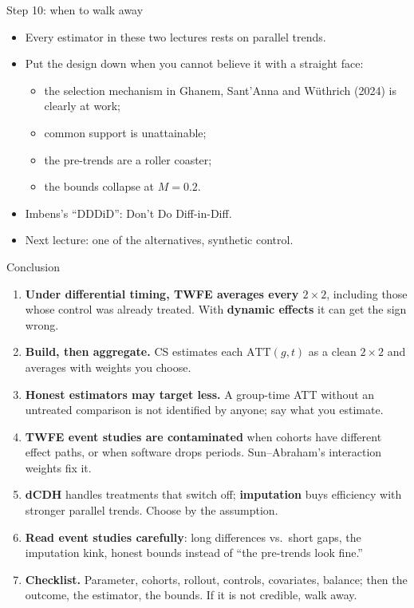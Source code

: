 \documentclass[
  11pt,
  ignorenonframetext,
  aspectratio=169,
]{beamer}
\providecommand{\tightlist}{%
  \setlength{\itemsep}{0pt}\setlength{\parskip}{0pt}}
\begin{document}
\begin{frame}{Step 10: when to walk away}
\protect{}\label{step-10-when-to-walk-away}
\begin{itemize}
\tightlist
\item
  Every estimator in these two lectures rests on parallel trends.
\item
  Put the design down when you cannot believe it with a straight face:

  \begin{itemize}
  \tightlist
  \item
    the selection mechanism in Ghanem, Sant'Anna and Wüthrich (2024) is
    clearly at work;
  \item
    common support is unattainable;
  \item
    the pre-trends are a roller coaster;
  \item
    the bounds collapse at \(M = 0.2\).
  \end{itemize}
\item
  Imbens's ``DDDiD'': Don't Do Diff-in-Diff.
\item
  Next lecture: one of the alternatives, synthetic control.
\end{itemize}
\end{frame}

\begin{frame}{Conclusion}
\protect{}\label{conclusion}
\begin{enumerate}
\tightlist
\item
  \textbf{Under differential timing, TWFE averages every
  \(2 \times 2\)}, including those whose control was already treated.
  With \textbf{dynamic effects} it can get the sign wrong.
\item
  \textbf{Build, then aggregate.} CS estimates each \(\text{ATT}(g,t)\)
  as a clean \(2 \times 2\) and averages with weights you choose.
\item
  \textbf{Honest estimators may target less.} A group-time ATT without
  an untreated comparison is not identified by anyone; say what you
  estimate.
\item
  \textbf{TWFE event studies are contaminated} when cohorts have
  different effect paths, or when software drops periods. Sun--Abraham's
  interaction weights fix it.
\item
  \textbf{dCDH} handles treatments that switch off; \textbf{imputation}
  buys efficiency with stronger parallel trends. Choose by the
  assumption.
\item
  \textbf{Read event studies carefully}: long differences vs.~short
  gaps, the imputation kink, honest bounds instead of ``the pre-trends
  look fine.''
\item
  \textbf{Checklist.} Parameter, cohorts, rollout, controls, covariates,
  balance; then the outcome, the estimator, the bounds. If it is not
  credible, walk away.
\end{enumerate}
\end{frame}
\end{document}

